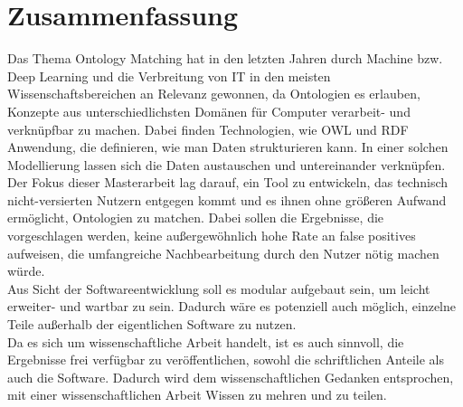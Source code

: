 %
\chapter{Zusammenfassung}
\label{chap:conclusion}      

Das Thema Ontology Matching hat in den letzten Jahren durch Machine bzw. Deep
Learning und die Verbreitung von IT in den meisten Wissenschaftsbereichen an
Relevanz gewonnen, da Ontologien es erlauben, Konzepte aus unterschiedlichsten
Domänen für Computer verarbeit- und verknüpfbar zu machen. Dabei
finden Technologien, wie OWL und RDF Anwendung, die definieren, wie man Daten
strukturieren kann. In einer solchen Modellierung lassen sich die Daten
austauschen und untereinander verknüpfen.\\
Der Fokus dieser Masterarbeit lag darauf, ein Tool zu entwickeln, das technisch
nicht-versierten Nutzern entgegen kommt und es ihnen ohne größeren Aufwand
ermöglicht, Ontologien zu matchen. Dabei sollen die Ergebnisse, die
vorgeschlagen werden, keine außergewöhnlich hohe Rate an false positives
aufweisen, die umfangreiche Nachbearbeitung durch den Nutzer nötig machen
würde.\\
Aus Sicht der Softwareentwicklung soll es modular aufgebaut sein, um leicht
erweiter- und wartbar zu sein. Dadurch wäre es potenziell auch möglich, einzelne
Teile außerhalb der eigentlichen Software zu nutzen.\\
Da es sich um wissenschaftliche Arbeit handelt, ist es auch sinnvoll, die
Ergebnisse frei verfügbar zu veröffentlichen, sowohl die schriftlichen Anteile
als auch die Software. Dadurch wird dem wissenschaftlichen Gedanken entsprochen,
mit einer wissenschaftlichen Arbeit Wissen zu mehren und zu teilen.

